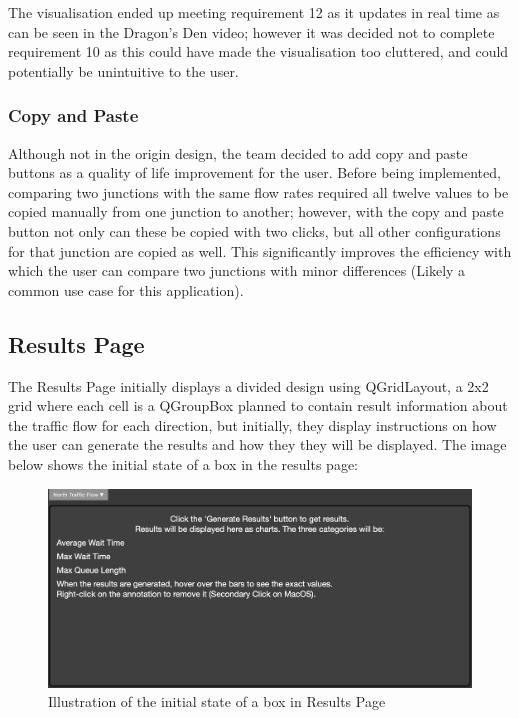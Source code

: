\documentclass{article}
\begin{document}
    The visualisation ended up meeting requirement 12 as it updates in real time as can be seen in the Dragon's Den video; however it was decided not to complete requirement 10 as this could have made the visualisation too cluttered, and could potentially be unintuitive to the user.

    \subsubsection{Copy and Paste}
    Although not in the origin design, the team decided to add copy and paste buttons as a quality of life improvement for the user.
    Before being implemented, comparing two junctions with the same flow rates required all twelve values to be copied manually from one junction to another; however, with the copy and paste button not only can these be copied with two clicks, but all other configurations for that junction are copied as well.
    This significantly improves the efficiency with which the user can compare two junctions with minor differences (Likely a common use case for this application).

    \subsection{Results Page}

    The Results Page initially displays a divided design using QGridLayout, a 2x2 grid where each cell is a QGroupBox planned to contain result information about the traffic flow for each direction, but initially,
    they display instructions on how the user can generate the results and how they they will be displayed. The image below shows the initial state of a box in the results page:

    \begin{figure}[H]
        \centering
        \includegraphics[width=\textwidth]{results1}
        \caption{Illustration of the initial state of a box in Results Page}
        \label{fig:results1}
    \end{figure}
\end{document}
